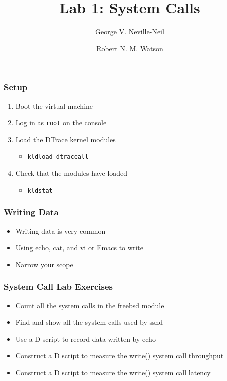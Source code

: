 \documentclass[pdftex,handout]{beamer}
\begin{document}

\title{Lab 1: System Calls}
\author[shortname]{George V. Neville-Neil \and Robert N. M. Watson}

\begin{frame}
  \titlepage
\end{frame}

\begin{frame}[fragile]
  \frametitle{Setup}
  \begin{enumerate}
  \item Boot the virtual machine
  \item Log in as \verb|root| on the console
  \item Load the DTrace kernel modules
    \begin{itemize}
    \item \verb|kldload dtraceall|
    \end{itemize}
  \item Check that the modules have loaded
    \begin{itemize}
    \item \verb|kldstat|
    \end{itemize}
  \end{enumerate}
\end{frame}

\begin{frame}
  \frametitle{Writing Data}
  \begin{itemize}
  \item Writing data is very common
  \item Using echo, cat, and vi or Emacs to write
  \item Narrow your scope
  \end{itemize}
\end{frame}

\begin{frame}[fragile]
  \frametitle{System Call Lab Exercises}
  \begin{itemize}
  \item Count all the system calls in the freebsd module
  \item Find and show all the system calls used by sshd
  \item Use a D script to record data written by echo
  \item Construct a D script to measure the write() system call throughput
  \item Construct a D script to measure the write() system call latency
  \end{itemize}
\end{frame}
\end{document}
